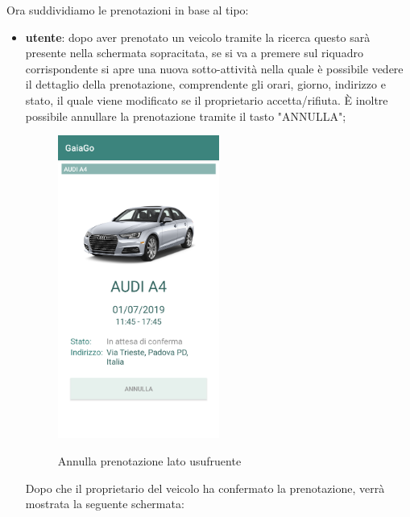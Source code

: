 Ora suddividiamo le prenotazioni in base al tipo:
\begin{itemize}
	\item \textbf{utente}: dopo aver prenotato un veicolo tramite la ricerca questo sarà presente nella schermata sopracitata, se si va a premere sul riquadro corrispondente si apre una nuova sotto-attività nella quale è possibile vedere il dettaglio della prenotazione, comprendente gli orari, giorno, indirizzo e stato, il quale viene modificato se il proprietario accetta/rifiuta. È inoltre possibile annullare la prenotazione tramite il tasto "ANNULLA";
	  \begin{figure}[H] 
		\centering 
		\includegraphics[width=0.5\textwidth]{res/images/annulla_usufruente.png}\\
		\caption{Annulla prenotazione lato usufruente}
		\label{annulla}
	\end{figure}
\pagebreak
	Dopo che il proprietario del veicolo ha confermato la prenotazione, verrà mostrata la seguente schermata:
	\begin{figure}[H] 
		\centering 

\end{figure}
\end{itemize}
